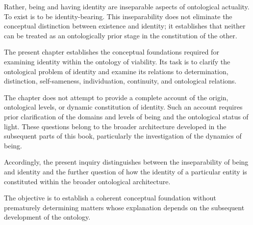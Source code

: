 Rather, being and having identity are inseparable
aspects of ontological actuality. To exist is to be
identity-bearing. This inseparability does not eliminate
the conceptual distinction between existence and
identity; it establishes that neither can be treated as
an ontologically prior stage in the constitution of
the other.

The present chapter establishes the conceptual
foundations required for examining identity within the
ontology of viability. Its task is to clarify the
ontological problem of identity and examine its
relations to determination, distinction, self-sameness,
individuation, continuity, and ontological relations.

The chapter does not attempt to provide a complete
account of the origin, ontological levels, or dynamic
constitution of identity. Such an account requires
prior clarification of the domains and levels of being
and the ontological status of light. These questions
belong to the broader architecture developed in the
subsequent parts of this book, particularly the
investigation of the dynamics of being.

Accordingly, the present inquiry distinguishes between
the inseparability of being and identity and the
further question of how the identity of a particular
entity is constituted within the broader ontological
architecture.

The objective is to establish a coherent conceptual
foundation without prematurely determining matters
whose explanation depends on the subsequent
development of the ontology.












